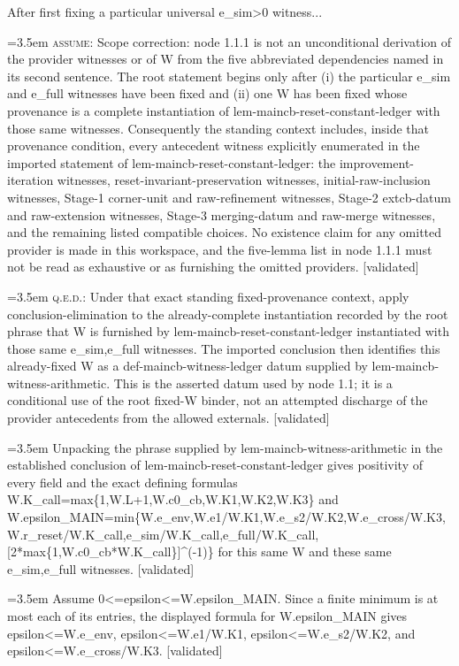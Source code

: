 \documentclass{article}
\newcommand{\step}[1]{\par\noindent\hangindent=3.5em\hangafter=1%
  \makebox[3.5em][l]{\textbf{#1.}}}
\newcommand{\steptag}[1]{\hfill{\small\textsf{[#1]}}}
\begin{document}
\begin{proofbox}{After first fixing a particular universal e\_sim>0 witness...}
\step{1.1.1.1} \textsc{assume}: Scope correction: node 1.1.1 is not an unconditional derivation of the provider witnesses or of W from the five abbreviated dependencies named in its second sentence. The root statement begins only after (i) the particular e\_sim and e\_full witnesses have been fixed and (ii) one W has been fixed whose provenance is a complete instantiation of lem-maincb-reset-constant-ledger with those same witnesses. Consequently the standing context includes, inside that provenance condition, every antecedent witness explicitly enumerated in the imported statement of lem-maincb-reset-constant-ledger: the improvement-iteration witnesses, reset-invariant-preservation witnesses, initial-raw-inclusion witnesses, Stage-1 corner-unit and raw-refinement witnesses, Stage-2 extcb-datum and raw-extension witnesses, Stage-3 merging-datum and raw-merge witnesses, and the remaining listed compatible choices. No existence claim for any omitted provider is made in this workspace, and the five-lemma list in node 1.1.1 must not be read as exhaustive or as furnishing the omitted providers. \steptag{validated} \\[4pt]
\step{1.1.1.2} \textsc{q.e.d.}: Under that exact standing fixed-provenance context, apply conclusion-elimination to the already-complete instantiation recorded by the root phrase that W is furnished by lem-maincb-reset-constant-ledger instantiated with those same e\_sim,e\_full witnesses. The imported conclusion then identifies this already-fixed W as a def-maincb-witness-ledger datum supplied by lem-maincb-witness-arithmetic. This is the asserted datum used by node 1.1; it is a conditional use of the root fixed-W binder, not an attempted discharge of the provider antecedents from the allowed externals. \steptag{validated} \\[4pt]
\step{1.1.2} Unpacking the phrase supplied by lem-maincb-witness-arithmetic in the established conclusion of lem-maincb-reset-constant-ledger gives positivity of every field and the exact defining formulas W.K\_call=max\{1,W.L+1,W.c0\_cb,W.K1,W.K2,W.K3\} and W.epsilon\_MAIN=min\{W.e\_env,W.e1/W.K1,W.e\_s2/W.K2,W.e\_cross/W.K3,W.r\_reset/W.K\_call,e\_sim/W.K\_call,e\_full/W.K\_call,[2*max\{1,W.c0\_cb*W.K\_call\}]\textasciicircum{}(-1)\} for this same W and these same e\_sim,e\_full witnesses. \steptag{validated} \\[4pt]
\step{1.2} Assume 0<=epsilon<=W.epsilon\_MAIN. Since a finite minimum is at most each of its entries, the displayed formula for W.epsilon\_MAIN gives epsilon<=W.e\_env, epsilon<=W.e1/W.K1, epsilon<=W.e\_s2/W.K2, and epsilon<=W.e\_cross/W.K3. \steptag{validated} \\[4pt]

\end{proofbox}
\end{document}
